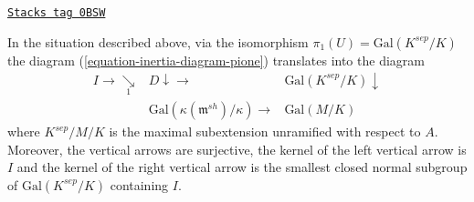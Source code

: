 \begin{lemma}
\label{pione-lemma-identify-inertia}
\href{https://stacks.math.columbia.edu/tag/0BSW}{\texttt{Stacks tag 0BSW}}

In the situation described above, via the isomorphism
$\pi_1(U) = \text{Gal}(K^{sep}/K)$ the diagram
(\ref{equation-inertia-diagram-pione})
translates into the diagram
$$
\begin{array}{ccc}I \longrightarrow\underset{1}{\searrow} & D \downarrow\longrightarrow & \text{Gal}(K^{sep}/K) \downarrow \\  & \text{Gal}(\kappa(\mathfrak m^{sh})/\kappa) \longrightarrow & \text{Gal}(M/K)\end{array}
$$
where $K^{sep}/M/K$ is the maximal subextension unramified
with respect to $A$. Moreover, the vertical arrows are surjective,
the kernel of the left vertical arrow is $I$ and the kernel of the
right vertical arrow is
the smallest closed normal subgroup of $\text{Gal}(K^{sep}/K)$
containing $I$.
\end{lemma}

